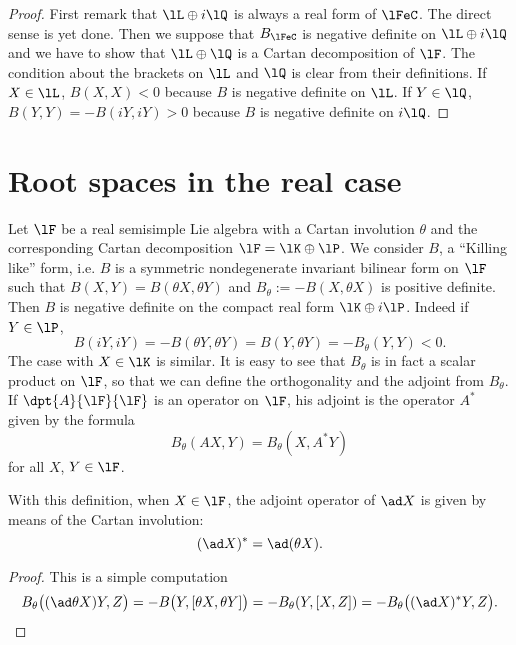 \begin{proof}
	First remark that $\lL\oplus i\lQ$ is always a real form of $\lFeC$. The direct sense is yet done. Then we suppose that $B_{\lFeC}$ is negative definite on $\lL\oplus i\lQ$ and we have to show that $\lL\oplus\lQ$ is a Cartan decomposition of $\lF$. The condition about the brackets on $\lL$ and $\lQ$ is clear from their definitions. If $X\in\lL$, $B(X,X)<0$ because $B$ is negative definite on $\lL$. If $Y\in\lQ$, $B(Y,Y)=-B(iY,iY)>0$ because $B$ is negative definite on $i\lQ$.
\end{proof}

\section{Root spaces in the real case}

Let $\lF$ be a real semisimple Lie algebra with a Cartan involution $\theta$ and the corresponding Cartan decomposition $\lF=\lK\oplus\lP$. We consider $B$, a ``Killing like''{} form, i.e. $B$ is a symmetric nondegenerate invariant bilinear form on $\lF$ such that $B(X,Y)=B(\theta X,\theta Y)$ and $B_{\theta}:=-B(X,\theta X)$ is positive definite. Then $B$ is negative definite on the compact real form $\lK\oplus i\lP$. Indeed if $Y\in\lP$,
\begin{equation}
	B(iY,iY)=-B(\theta Y,\theta Y)
	=B(Y,\theta Y)
	=-B_{\theta}(Y,Y)<0.
\end{equation}
The case with $X\in\lK$ is similar. It is easy to see that $B_{\theta}$ is in fact a scalar product on $\lF$, so that we can define the orthogonality and the adjoint from $B_{\theta}$. If $\dpt{A}{\lF}{\lF}$ is an operator on $\lF$, his adjoint is the operator $A^*$ given by the formula
\[
	B_{\theta}(A X,Y)=B_{\theta}(X,A^*Y)
\]
for all $X$, $Y\in\lF$.

\begin{proposition}
	With this definition, when $X\in\lF$, the adjoint operator of $\ad X$ is given by means of the Cartan involution:
	\[
		(\ad X)^*= \ad(\theta X).
	\]
\end{proposition}

\begin{proof}
	This is a simple computation
	\begin{equation}
		B_{\theta}\big(  (\ad\theta X)Y,Z \big)=-B\big(  Y,[\theta X,\theta Y]  \big)
		=-B_{\theta}(Y,[X,Z])
		=-B_{\theta}\big( (\ad X)^*Y,Z \big).
	\end{equation}
\end{proof}

